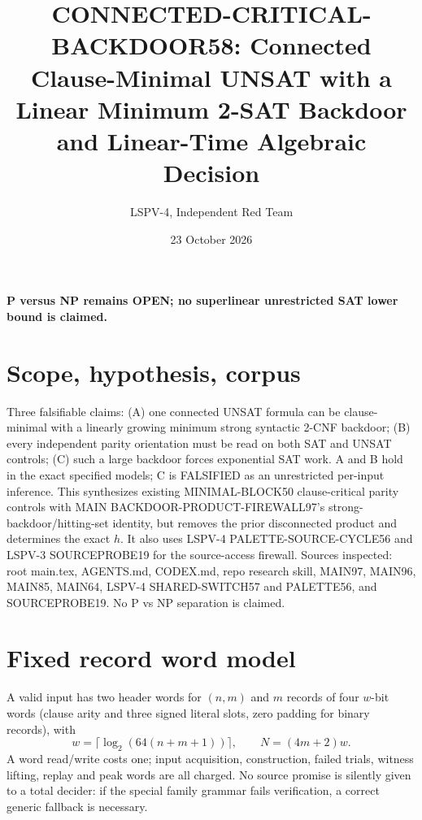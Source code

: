 \documentclass[11pt]{article}
\title{CONNECTED-CRITICAL-BACKDOOR58: Connected Clause-Minimal UNSAT with a Linear Minimum 2-SAT Backdoor and Linear-Time Algebraic Decision}
\author{LSPV-4, Independent Red Team}
\date{23 October 2026}
\begin{document}
\maketitle
\begin{center}\textbf{P versus NP remains OPEN; no superlinear unrestricted SAT lower bound is claimed.}\end{center}
\section{Scope, hypothesis, corpus}
Three falsifiable claims: (A) one connected UNSAT formula can be clause-minimal with a linearly growing minimum strong syntactic 2-CNF backdoor; (B) every independent parity orientation must be read on both SAT and UNSAT controls; (C) such a large backdoor forces exponential SAT work. A and B hold in the exact specified models; C is FALSIFIED as an unrestricted per-input inference.
This synthesizes existing MINIMAL-BLOCK50 clause-critical parity controls with MAIN BACKDOOR-PRODUCT-FIREWALL97's strong-backdoor/hitting-set identity, but removes the prior disconnected product and determines the exact $h$. It also uses LSPV-4 PALETTE-SOURCE-CYCLE56 and LSPV-3 SOURCEPROBE19 for the source-access firewall. Sources inspected: root main.tex, AGENTS.md, CODEX.md, repo research skill, MAIN97, MAIN96, MAIN85, MAIN64, LSPV-4 SHARED-SWITCH57 and PALETTE56, and SOURCEPROBE19. No P vs NP separation is claimed.

\section{Fixed record word model}
A valid input has two header words for $(n,m)$ and $m$ records of four $w$-bit words (clause arity and three signed literal slots, zero padding for binary records), with
\[
w=\lceil\log_2(64(n+m+1))\rceil,\qquad N=(4m+2)w.
\]
A word read/write costs one; input acquisition, construction, failed trials, witness lifting, replay and peak words are all charged. No source promise is silently given to a total decider: if the special family grammar fails verification, a correct generic fallback is necessary.
\end{document}
